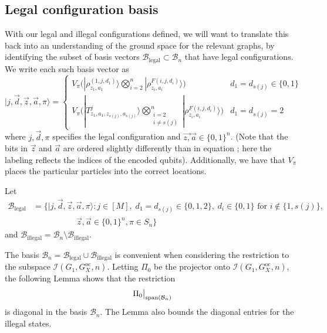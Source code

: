 \documentclass[../thesis-main/thesis-main]{subfiles}
\begin{document}
\subsection{Legal configuration basis}\label{sec:legal_config_basis}

With our legal and illegal configurations defined, we will want to translate this back into an understanding of the ground space for the relevant graphs, by identifying the subset of basis vectors $\mathcal{B}_{\text{legal}}\subset\mathcal{B}_{n}$ that have legal configurations. We write each such basis vector as
\begin{equation}
|j,\vec{d},\vec{z},\vec{a},\pi\rangle=\begin{cases}
V_\pi\Big(|\rho_{z_{1},a_{1}}^{(1,j,d_{1})}\rangle\displaystyle\bigotimes_{i=2}^{n}|\rho_{z_{i},a_{i}}^{F(i,j,d_{i})}\rangle\Big) & d_{1}=d_{s(j)}\in\{0,1\}\\
V_\pi\bigg(|T_{z_{1},a_{1},z_{s(j)},a_{s(j)}}^{j}\rangle\displaystyle\bigotimes_{\substack{i=2\\i\neq s(j)}}^n |\rho_{z_{i},a_{i}}^{F(i,j,d_{i})}\rangle\bigg) & d_{1}=d_{s(j)}=2
\end{cases}\label{eq:legal_states}
\end{equation}
where $j,\vec{d},\pi$ specifies the legal configuration and $\vec{z,}\vec{a}\in\{0,1\}^{n}$. (Note that the bits in $\vec{z}$ and $\vec{a}$ are ordered slightly differently than in equation ; here the labeling reflects the indices of the encoded qubits). Additionally, we have that $V_\pi$ places the particular particles into the correct locations.

\begin{definition}
Let  
\begin{align}
\mathcal{B}_{\text{legal}}&=\big\{ |j,\vec{d},\vec{z},\vec{a},\pi\rangle\colon j\in [M],\; d_{1}=d_{s(j)}\in\{0,1,2\},\; d_{i}\in\{0,1\}\text{ for }i\notin\{1,s(j)\},\nonumber\\
&\qquad \quad \qquad\;\vec{z},\vec{a}\in\{0,1\}^{n}, \pi \in S_n\big\} 
\end{align}
 and $\mathcal{B}_{\text{illegal}}=\mathcal{B}_{n}\setminus\mathcal{B}_{\text{illegal}}.$ 
\end{definition}

The basis $\mathcal{B}_{n}=\mathcal{B}_{\text{legal}}\cup\mathcal{B}_{\text{illegal}}$ is convenient when considering the restriction to the subspace $\mathcal{I}(G_{1},G_X^{\text{oc}},n)$. Letting $\Pi_{0}$ be the projector onto $\mathcal{I}(G_{1},G_X^{\text{oc}},n)$, the following Lemma shows that the restriction 
\begin{equation}
\Pi_{0}\big|_{\operatorname{span}(\mathcal{B}_{n})}\label{eq:restrictionBn}
\end{equation}
is diagonal in the basis $\mathcal{B}_n$. The Lemma also bounds the diagonal entries for the illegal states.  
\end{document}
